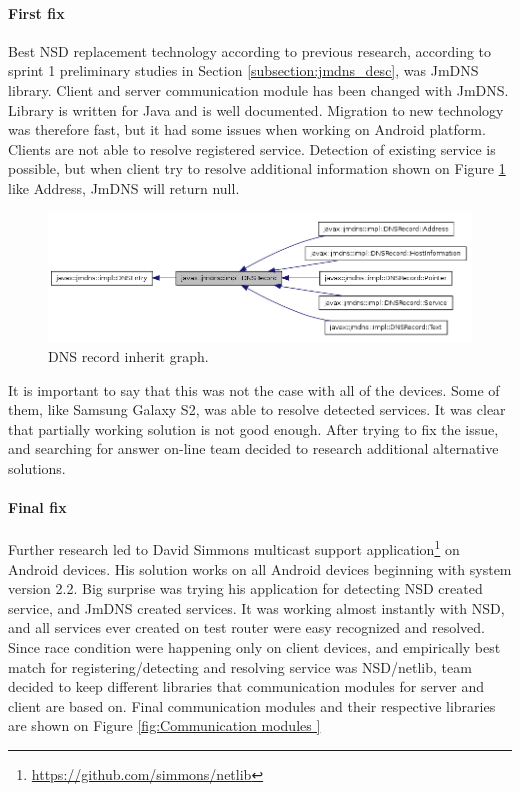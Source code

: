 \paragraph{First fix}
Best NSD replacement technology according to previous research, according to sprint 1 preliminary studies in Section \ref{subsection:jmdns_desc}, was JmDNS library. 
Client and server communication module has been changed with JmDNS. Library is written for Java and is well documented.
Migration to new technology was therefore fast, but it had some issues when working on Android platform. Clients are not able to resolve registered service.
Detection of existing service is possible, but when client try to resolve additional information shown on Figure \ref{fig:DNS record inherit graph } like Address, JmDNS will return null.

\begin{figure}[H]
	\centering
		\includegraphics[width=17cm]{sprint5/jmdns.png}
	\caption{DNS record inherit graph.}
	\label{fig:DNS record inherit graph }
\end{figure}

It is important to say that this was not the case with all of the devices. Some of them, like Samsung Galaxy S2, was able to resolve detected services. It was clear that partially working solution is not good enough. After trying to fix the issue, and searching for answer on-line team decided to research additional alternative solutions.

\paragraph{Final fix}
Further research led to David Simmons multicast support application\footnote{\url{https://github.com/simmons/netlib}} on Android devices. His solution works on all Android devices beginning with system version 2.2. Big surprise was trying his application for detecting NSD created service, and JmDNS created services. It was working almost instantly with NSD, and all services ever created on test router were easy recognized and resolved. Since race condition were happening only on client devices, and empirically best match for registering/detecting and resolving service was NSD/netlib, team decided to keep different libraries that communication modules for server and client are based on. Final communication modules and their respective libraries are shown on Figure \ref{fig:Communication modules }


